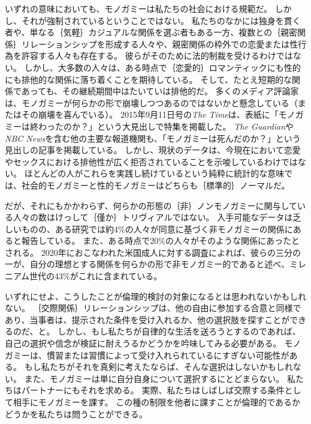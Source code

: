\documentclass[paper=a4,book,openany]{jlreq}
\begin{document}
いずれの意味においても、モノガミーは私たちの社会における規範だ。
しかし、それが強制されているということではない。
私たちのなかには独身を貫く者や、単なる｛気軽｝{カジュアル}な関係を選ぶ者もある一方、複数との｛親密関係｝{リレーションシップ}を形成する人々や、親密関係の枠外での恋愛または性行為を許容する人々も存在する。
彼らがそのために法的制裁を受けるわけではない。
しかし、大多数の人々は、ある時点で｛恋愛的｝{ロマンティック}にも性的にも排他的な関係に落ち着くことを期待している。
そして、たとえ短期的な関係であっても、その継続期間中はたいていは排他的だ。
多くのメディア評論家は、モノガミーが何らかの形で崩壊しつつあるのではないかと懸念している（またはその崩壊を喜んでいる）。
2015年9月11日号の\emph{The Time}は、表紙に「モノガミーは終わったのか？」という大見出しで特集を掲載した\citep{magazine15:_is_monog_over}。
\emph{The Guardian}や\emph{NBC News}を含む他の主要な報道機関も、「モノガミーは死んだのか？」という見出しの記事を掲載している\citep{alexander05:_is_monog_dead,jeffries12:_sex_issue}。
しかし、現状のデータは、今現在において恋愛やセックスにおける排他性が広く拒否されていることを示唆しているわけではない。
ほとんどの人がこれらを実践し続けているという純粋に統計的な意味では、社会的モノガミーと性的モノガミーはどちらも｛標準的｝{ノーマル}だ。

だが、それにもかかわらず、何らかの形態の｛非｝{ノン}モノガミーに関与している人々の数はけっして｛僅か｝{トリヴィアル}ではない。
入手可能なデータは乏しいものの、ある研究では約4\%の人々が同意に基づく非モノガミーの関係にあると報告している。
また、ある時点で20\%の人々がそのような関係にあったとされる\citep{haupert17:_preval_exper_consen_nonmon_relat}。
2020年におこなわれた米国成人に対する調査によれば、彼らの三分の一が、自分の理想とする関係を何らかの形で非モノガミー的であると述べ、ミレニアム世代の43\%がこれに含まれている\citep{ballard20:_millen_are_less_likel_want_monog_relat}。

いずれにせよ、こうしたことが倫理的検討の対象になるとは思われないかもしれない。
｛交際関係｝{リレーションシップ}は、他の自由に参加する合意と同様であり、当事者は、提示された条件を受け入れるか、他の選択肢を探すことができるのだ、と。
しかし、もし私たちが自律的な生活を送ろうとするのであれば、自己の選択や信念が検証に耐えうるかどうかを吟味してみる必要がある。
モノガミーは、慣習または習慣によって受け入れられているにすぎない可能性がある。
もし私たちがそれを真剣に考えたならば、そんな選択はしないかもしれない。
また、モノガミーは単に自分自身について選択するにとどまらない。
私たちはパートナーにもそれを求める。
実際、私たちはしばしば交際する条件として相手にモノガミーを課す。
この種の制限を他者に課すことが倫理的であるかどうかを私たちは問うことができる。
\end{document}
